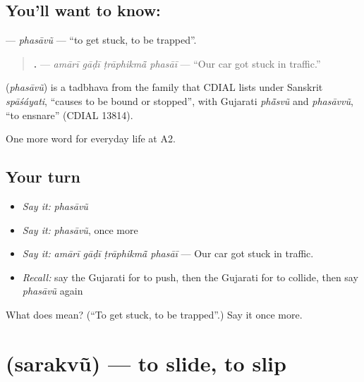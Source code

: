 \subsection*{You'll want to know: }
\textbf{} — \emph{phasāvũ} — \textquotedblleft{}to get stuck, to be trapped\textquotedblright{}.

\begin{quote}
\textbf{   .} — \emph{amārī gāḍī ṭrāphikmā̃ phasāī} — \textquotedblleft{}Our car got stuck in traffic.\textquotedblright{}
\end{quote}

\begin{cousinweb}
\textbf{} (\emph{phasāvũ}) is a tadbhava from the family that CDIAL lists under Sanskrit \emph{spāśáyati}, \textquotedblleft{}causes to be bound or stopped\textquotedblright{}, with Gujarati \emph{phā̃svũ} and \emph{phasāvvũ}, \textquotedblleft{}to ensnare\textquotedblright{} (CDIAL 13814).
\end{cousinweb}

\begin{grammarlens}[title={What you've built}]
One more word for everyday life at A2.
\end{grammarlens}

\subsection*{Your turn}
\begin{itemize}
\raggedright
  \item \emph{Say it:} \emph{phasāvũ}
  \item \emph{Say it:} \emph{phasāvũ}, once more
  \item \emph{Say it:} \emph{amārī gāḍī ṭrāphikmā̃ phasāī} — Our car got stuck in traffic.
  \item \emph{Recall:} say the Gujarati for to push, then the Gujarati for to collide, then say \emph{phasāvũ} again
\end{itemize}

\begin{tcolorbox}[breakable,colback=teal!4,colframe=teal!35!black,title={Before you move on}]
What does  mean? (\textquotedblleft{}To get stuck, to be trapped\textquotedblright{}.) Say it once more.
\end{tcolorbox}
\section[\texorpdfstring{\gu{સરકવું} (sarakvũ)}{સરકવું (sarakvũ)}]{ (sarakvũ) — to slide, to slip}

